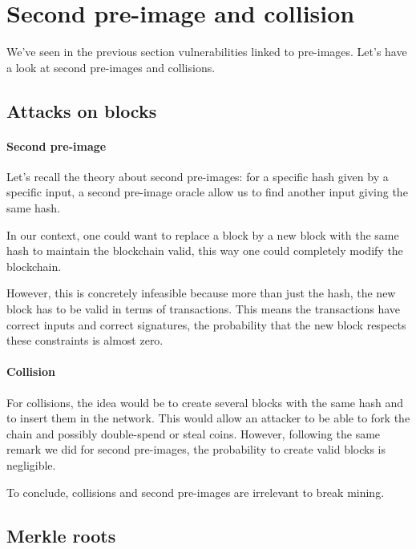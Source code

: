 \section{Second pre-image and collision}

We've seen in the previous section vulnerabilities linked to pre-images. Let's have a look at second pre-images and collisions.

  \subsection{Attacks on blocks}

    \paragraph{Second pre-image}

Let's recall the theory about second pre-images: for a specific hash given by a specific input, a second pre-image oracle allow us to find another input giving the same hash.

In our context, one could want to replace a block by a new block with the same hash to maintain the blockchain valid, this way one could completely modify the blockchain.

However, this is concretely infeasible because more than just the hash, the new block has to be valid in terms of transactions. This means the transactions have correct inputs and correct signatures, the probability that the new block respects these constraints is almost zero. \newline

    \paragraph{Collision}

For collisions, the idea would be to create several blocks with the same hash and to insert them in the network. This would allow an attacker to be able to fork the chain and possibly double-spend or steal coins.
However, following the same remark we did for second pre-images, the probability to create valid blocks is negligible. \newline

To conclude, collisions and second pre-images are irrelevant to break mining.

  \subsection{Merkle roots}

